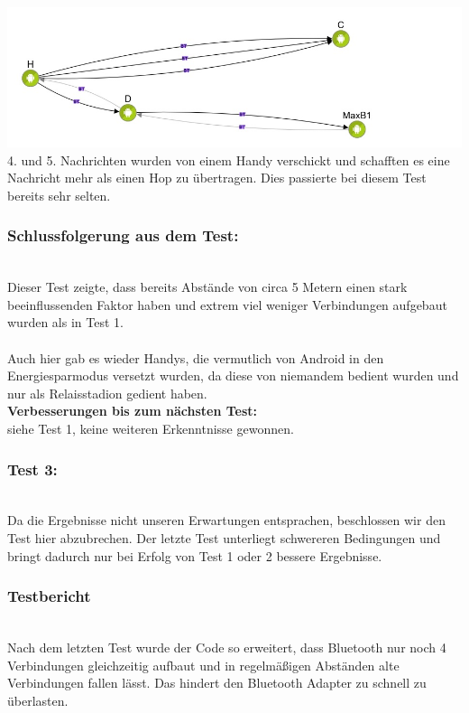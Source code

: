 \includegraphics[width=1.0\textwidth]{belege/grosstests/Bilder/Test2Misserfolg6.jpg}\\ 4. und
5. Nachrichten wurden von einem Handy verschickt und schafften es eine
Nachricht mehr als einen Hop zu übertragen. Dies passierte bei diesem
Test bereits sehr selten.\\

\subsubsection{Schlussfolgerung aus dem
Test:}\label{schlussfolgerung-aus-dem-test-1}\\

Dieser Test zeigte, dass bereits Abstände von circa 5 Metern einen stark
beeinflussenden Faktor haben und extrem viel weniger Verbindungen
aufgebaut wurden als in Test 1.\\\\

Auch hier gab es wieder Handys, die vermutlich von Android in den
Energiesparmodus versetzt wurden, da diese von niemandem bedient wurden
und nur als Relaisstadion gedient haben.
\\
\textbf{Verbesserungen bis zum nächsten Test:}
\\
siehe Test 1, keine weiteren Erkenntnisse gewonnen.
\\
\subsubsection{Test 3:}\label{test-3}
\\
Da die Ergebnisse nicht unseren Erwartungen entsprachen, beschlossen wir
den Test hier abzubrechen. Der letzte Test unterliegt schwereren
Bedingungen und bringt dadurch nur bei Erfolg von Test 1 oder 2 bessere
Ergebnisse.
\\
\subsubsection{Testbericht}\label{testbericht-1}
\\
Nach dem letzten Test wurde der Code so erweitert, dass Bluetooth nur
noch 4 Verbindungen gleichzeitig aufbaut und in regelmäßigen Abständen
alte Verbindungen fallen lässt. Das hindert den Bluetooth Adapter zu
schnell zu überlasten.\\\\

